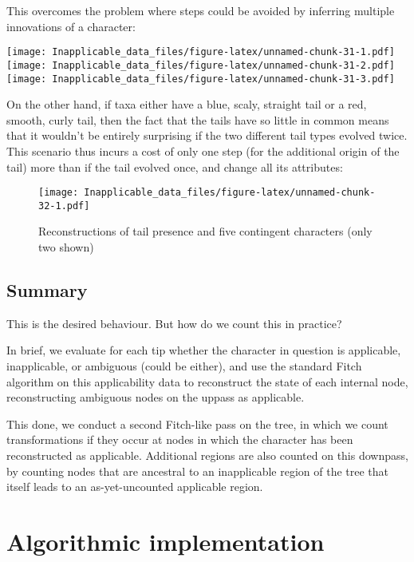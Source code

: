 \documentclass[]{book}
\theoremstyle{definition}
\theoremstyle{definition}
\theoremstyle{definition}
\theoremstyle{remark}
\begin{document}
This overcomes the problem where steps could be avoided by inferring
multiple innovations of a character:

\texttt{[image: Inapplicable\_data\_files/figure-latex/unnamed-chunk-31-1.pdf]}
\texttt{[image: Inapplicable\_data\_files/figure-latex/unnamed-chunk-31-2.pdf]}
\texttt{[image: Inapplicable\_data\_files/figure-latex/unnamed-chunk-31-3.pdf]}

On the other hand, if taxa either have a blue, scaly, straight tail or a
red, smooth, curly tail, then the fact that the tails have so little in
common means that it wouldn't be entirely surprising if the two
different tail types evolved twice. This scenario thus incurs a cost of
only one step (for the additional origin of the tail) more than if the
tail evolved once, and change all its attributes:

\begin{figure}
\centering
\texttt{[image: Inapplicable\_data\_files/figure-latex/unnamed-chunk-32-1.pdf]}
\caption{\label{fig:unnamed-chunk-32}Reconstructions of tail presence and
five contingent characters (only two shown)}
\end{figure}

\hypertarget{summary}{%
\subsection{Summary}\label{summary}}

This is the desired behaviour. But how do we count this in practice?

In brief, we evaluate for each tip whether the character in question is
applicable, inapplicable, or ambiguous (could be either), and use the
standard Fitch algorithm on this applicability data to reconstruct the
state of each internal node, reconstructing ambiguous nodes on the
uppass as applicable.

This done, we conduct a second Fitch-like pass on the tree, in which we
count transformations if they occur at nodes in which the character has
been reconstructed as applicable. Additional regions are also counted on
this downpass, by counting nodes that are ancestral to an inapplicable
region of the tree that itself leads to an as-yet-uncounted applicable
region.

\hypertarget{algorithm}{%
\section{Algorithmic implementation}\label{algorithm}}
\end{document}

